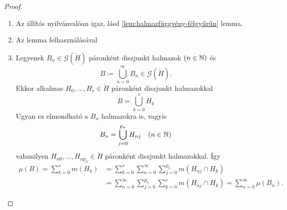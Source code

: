 \documentclass[
]{elteikthesis}[2024/04/26]
\begin{document}
	\begin{proof}\,
		\begin{enumerate}
			\item Az állítás nyilvánvalóan igaz, lásd \ref{lem:halmazfüggvény-félgyűrűn} lemma.
			
			\item Az lemma felhasználásával 
			
			\item Legyenek \( B_n \in \mathcal{G}(\ring{H}) \) páronként diszjunkt halmazok 
			\( (n \in \mathbb{N}) \) és
			\[
				B \coloneq \bigcup_{n=0}^{\infty} B_n \in \mathcal{G}(\ring{H}).
			\]
			Ekkor alkalmas \( H_0, \dots, H_s \in \ring{H} \) páronként diszjunkt halmazokkal
			\[
				B = \bigcup_{k=0}^{s} H_k
			\]
			Ugyan ez elmondható a \( B_n \) halmazokra is, vagyis
			\[
				B_n = \bigcup_{j=0}^{p_n} H_{nj} \quad (n \in \mathbb{N})
			\]
			valamilyen \( H_{n0}, \dots, H_{np_n} \in \ring{H} \) páronként diszjunkt halmazokkal.
			Így
			\begin{align*}
				\mu(B)
				 = \sum_{k=0}^{s} m( H_k )
				&= \sum_{k=0}^{s} \sum_{n=0}^{\infty} \sum_{j=0}^{p_n} m( H_{nj} \cap H_k ) \\
				&= \sum_{n=0}^{\infty} \sum_{j=0}^{p_n} \sum_{k=0}^{s} m( H_{nj} \cap H_k ) 
				 = \sum_{n=0}^{\infty} \mu( B_n ).
			\end{align*}
		\end{enumerate}
	\end{proof}
	
\end{document}
